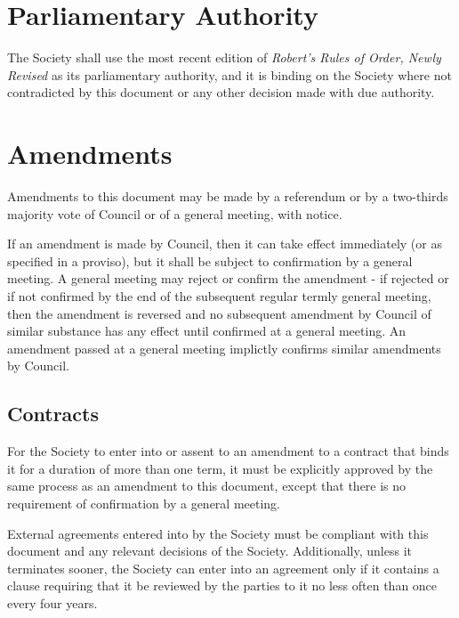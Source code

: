 \section{Parliamentary Authority}
The Society shall use the most recent edition of
\emph{Robert's Rules of Order, Newly Revised} as its parliamentary authority,
and it is binding on the Society where not contradicted by this document or any
other decision made with due authority.

\section{Amendments}
Amendments to this document may be made by a referendum or by a two-thirds
majority vote of Council or of a general meeting, with notice.

If an amendment is made by Council, then it can take effect immediately (or as
specified in a proviso), but it shall be subject to confirmation by a general
meeting. A general meeting may reject or confirm the amendment - if rejected
or if not confirmed by the end of the subsequent regular termly general meeting,
then the amendment is reversed and no subsequent amendment by Council of similar
substance has any effect until confirmed at a general meeting. An amendment
passed at a general meeting implictly confirms similar amendments by Council.

\subsection{Contracts}
For the Society to enter into or assent to an amendment to a contract
that binds it for a duration of more than one term, it must be explicitly
approved by the same process as an amendment to this document, except that there
is no requirement of confirmation by a general meeting.

External agreements entered into by the Society must be compliant with this
document and any relevant decisions of the Society. Additionally, unless it
terminates sooner, the Society can enter into an agreement only if it contains a
clause requiring that it be reviewed by the parties to it no less often than
once every four years.

\appendix
{}
